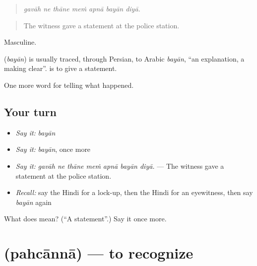 \begin{quote}
      
\end{quote}

\begin{quote}
\emph{gavāh ne thāne meṁ apnā bayān diyā.}
\end{quote}

\begin{quote}
The witness gave a statement at the police station.
\end{quote}

Masculine.

\begin{cousinweb}
\textbf{} (\emph{bayān}) is usually traced, through Persian, to Arabic \emph{bayān}, \textquotedblleft{}an explanation, a making clear\textquotedblright{}. \textbf{ } is to give a statement.
\end{cousinweb}

\begin{grammarlens}[title={What you've built}]
One more word for telling what happened.
\end{grammarlens}

\subsection*{Your turn}
\begin{itemize}
\raggedright
  \item \emph{Say it:} \emph{bayān}
  \item \emph{Say it:} \emph{bayān}, once more
  \item \emph{Say it:} \emph{gavāh ne thāne meṁ apnā bayān diyā.} — The witness gave a statement at the police station.
  \item \emph{Recall:} say the Hindi for a lock-up, then the Hindi for an eyewitness, then say \emph{bayān} again
\end{itemize}

\begin{tcolorbox}[breakable,colback=teal!4,colframe=teal!35!black,title={Before you move on}]
What does  mean? (\textquotedblleft{}A statement\textquotedblright{}.) Say it once more.
\end{tcolorbox}
\section[\texorpdfstring{\hi{पहचानना} (pahcānnā)}{पहचानना (pahcānnā)}]{ (pahcānnā) — to recognize}

